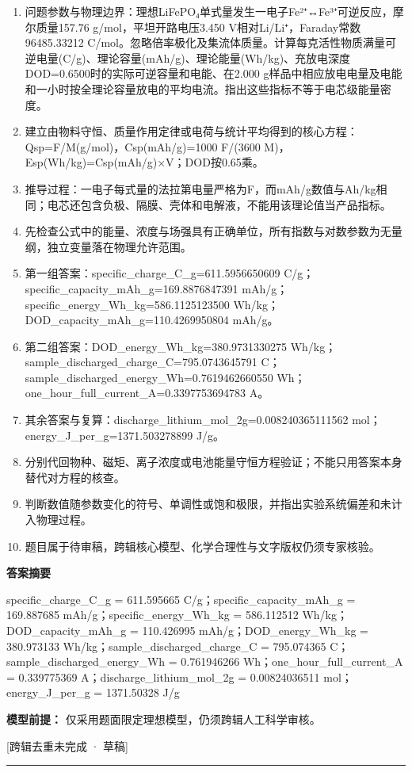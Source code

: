 \documentclass[UTF8,11pt,a4paper]{ctexart}
\begin{document}
\begin{enumerate}
\item 问题参数与物理边界：理想LiFePO₄单式量发生一电子Fe²⁺↔Fe³⁺可逆反应，摩尔质量157.76 g/mol，平坦开路电压3.450 V相对Li/Li⁺，Faraday常数96485.33212 C/mol。忽略倍率极化及集流体质量。计算每克活性物质满量可逆电量(C/g)、理论容量(mAh/g)、理论能量(Wh/kg)、充放电深度DOD=0.6500时的实际可逆容量和电能、在2.000 g样品中相应放电电量及电能和一小时按全理论容量放电的平均电流。指出这些指标不等于电芯级能量密度。
\item 建立由物料守恒、质量作用定律或电荷与统计平均得到的核心方程：Qsp=F/M(g/mol)，Csp(mAh/g)=1000 F/(3600 M)，Esp(Wh/kg)=Csp(mAh/g)×V；DOD按0.65乘。
\item 推导过程：一电子每式量的法拉第电量严格为F，而mAh/g数值与Ah/kg相同；电芯还包含负极、隔膜、壳体和电解液，不能用该理论值当产品指标。
\item 先检查公式中的能量、浓度与场强具有正确单位，所有指数与对数参数为无量纲，独立变量落在物理允许范围。
\item 第一组答案：specific\_charge\_C\_g=611.5956650609 C/g；specific\_capacity\_mAh\_g=169.8876847391 mAh/g；specific\_energy\_Wh\_kg=586.1125123500 Wh/kg；DOD\_capacity\_mAh\_g=110.4269950804 mAh/g。
\item 第二组答案：DOD\_energy\_Wh\_kg=380.9731330275 Wh/kg；sample\_discharged\_charge\_C=795.0743645791 C；sample\_discharged\_energy\_Wh=0.7619462660550 Wh；one\_hour\_full\_current\_A=0.3397753694783 A。
\item 其余答案与复算：discharge\_lithium\_mol\_2g=0.008240365111562 mol；energy\_J\_per\_g=1371.503278899 J/g。
\item 分别代回物种、磁矩、离子浓度或电池能量守恒方程验证；不能只用答案本身替代对方程的核查。
\item 判断数值随参数变化的符号、单调性或饱和极限，并指出实验系统偏差和未计入物理过程。
\item 题目属于待审稿，跨辑核心模型、化学合理性与文字版权仍须专家核验。
\end{enumerate}
\noindent\textbf{答案摘要}\par
specific\_charge\_C\_g = 611.595665 C/g；specific\_capacity\_mAh\_g = 169.887685 mAh/g；specific\_energy\_Wh\_kg = 586.112512 Wh/kg；DOD\_capacity\_mAh\_g = 110.426995 mAh/g；DOD\_energy\_Wh\_kg = 380.973133 Wh/kg；sample\_discharged\_charge\_C = 795.074365 C；sample\_discharged\_energy\_Wh = 0.761946266 Wh；one\_hour\_full\_current\_A = 0.339775369 A；discharge\_lithium\_mol\_2g = 0.00824036511 mol；energy\_J\_per\_g = 1371.50328 J/g\par
\noindent\textbf{模型前提：}
仅采用题面限定理想模型，仍须跨辑人工科学审核。\par
\noindent\textcolor{red!65!black}{[跨辑去重未完成 · 草稿]} \par
\medskip\hrule\medskip
{}
\end{document}
